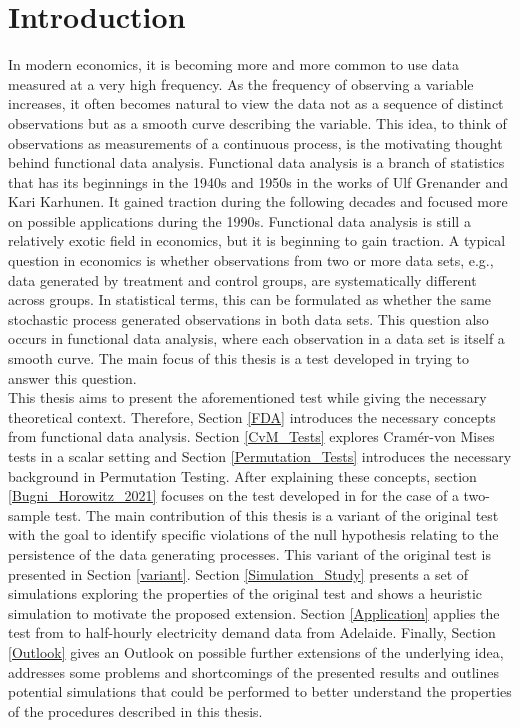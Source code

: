 \documentclass[12pt, a4paper]{article}
\theoremstyle{MAstyle} \newtheorem{assumption}{Assumption}[section]
\theoremstyle{MAstyle} \newtheorem{definition}{Definition}[section]
\theoremstyle{MAstyle} \newtheorem{theorem}{Theorem}[section]
\begin{document}
	\section{Introduction}
		In modern economics, it is becoming more and more common to use data measured at a very high frequency. As the frequency of observing a variable increases, it often becomes natural to view the data not as a sequence of distinct observations but as a smooth curve describing the variable.
		This idea, to think of observations as measurements of a continuous process, is the motivating thought behind functional data analysis. Functional data analysis is a branch of statistics that has its beginnings in the 1940s and 1950s in the works of Ulf Grenander and Kari Karhunen. It gained traction during the following decades and focused more on possible applications during the 1990s. Functional data analysis is still a relatively exotic field in economics, but it is beginning to gain traction.
		A typical question in economics is whether observations from two or more data sets, e.g., data generated by treatment and control groups, are systematically different across groups. In statistical terms, this can be formulated as whether the same stochastic process generated observations in both data sets.				
		This question also occurs in functional data analysis, where each observation in a data set is itself a smooth curve. The main focus of this thesis is a test developed in \cite{bugni_permutation_2021} trying to answer this question.\\
		
		This thesis aims to present the aforementioned test while giving the necessary theoretical context. Therefore, Section \ref{FDA} introduces the necessary concepts from functional data analysis. 
		Section \ref{CvM_Tests} explores Cram\'{e}r-von Mises tests in a scalar setting and Section \ref{Permutation_Tests} introduces the necessary background in Permutation Testing.
		After explaining these concepts, section \ref{Bugni_Horowitz_2021} focuses on the test developed in \cite{bugni_permutation_2021} for the case of a two-sample test.
		The main contribution of this thesis is a variant of the original test with the goal to identify specific violations of the null hypothesis relating to the persistence of the data generating processes. This variant of the original test is presented in Section \ref{variant}.
		Section \ref{Simulation_Study} presents a set of simulations exploring the properties of the original test and shows a heuristic simulation to motivate the proposed extension. 
		Section \ref{Application} applies the test from \cite{bugni_permutation_2021} to half-hourly electricity demand data from Adelaide.
		Finally, Section \ref{Outlook} gives an Outlook on possible further extensions of the underlying idea, addresses some problems and shortcomings of the presented results and outlines potential simulations that could be performed to better understand the properties of the procedures described in this thesis.
		
\end{document}
